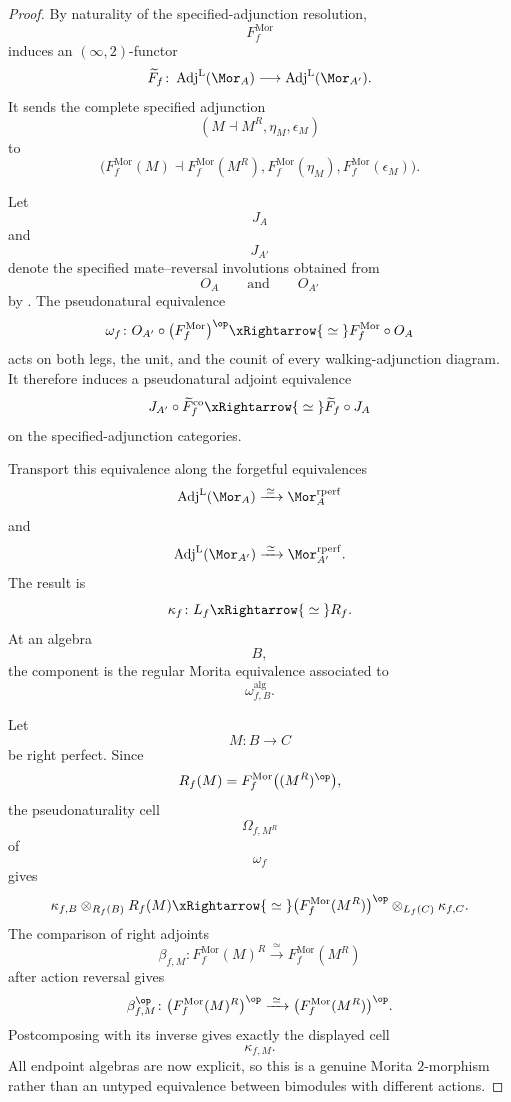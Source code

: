 \begin{proof}
By naturality of the specified-adjunction resolution,
\[
    F_f^{\mathrm{Mor}}
\]
induces an $(\infty,2)$-functor
\[
    \widetilde F_f
    \colon
    \operatorname{Adj}^{\mathrm L}(\Mor_A)
    \longrightarrow
    \operatorname{Adj}^{\mathrm L}(\Mor_{A'}).
\]
It sends the complete specified adjunction
\[
    (M\dashv M^R,\eta_M,\epsilon_M)
\]
to
\[
    \bigl(
        F_f^{\mathrm{Mor}}(M)
        \dashv
        F_f^{\mathrm{Mor}}(M^R),
        F_f^{\mathrm{Mor}}(\eta_M),
        F_f^{\mathrm{Mor}}(\epsilon_M)
    \bigr).
\]

Let
\[
    J_A
\]
and
\[
    J_{A'}
\]
denote the specified mate--reversal involutions obtained from
\[
    O_A
    \qquad\text{and}\qquad
    O_{A'}
\]
by
.
The pseudonatural equivalence
\[
    \omega_f
    \colon
    O_{A'}
    \circ
    \bigl(F_f^{\mathrm{Mor}}\bigr)^{\op}
    \xRightarrow{\;\simeq\;}
    F_f^{\mathrm{Mor}}
    \circ
    O_A
\]
acts on both legs, the unit, and the counit of every walking-adjunction
diagram. It therefore induces a pseudonatural adjoint equivalence
\[
    J_{A'}
    \circ
    \widetilde F_f^{\mathrm{co}}
    \xRightarrow{\;\simeq\;}
    \widetilde F_f
    \circ
    J_A
\]
on the specified-adjunction categories.

Transport this equivalence along the forgetful equivalences
\[
    \operatorname{Adj}^{\mathrm L}(\Mor_A)
    \xrightarrow{\;\simeq\;}
    \Mor_A^{\mathrm{rperf}}
\]
and
\[
    \operatorname{Adj}^{\mathrm L}(\Mor_{A'})
    \xrightarrow{\;\simeq\;}
    \Mor_{A'}^{\mathrm{rperf}}.
\]
The result is
\[
    \kappa_f
    \colon
    L_f
    \xRightarrow{\;\simeq\;}
    R_f.
\]
At an algebra
\[
    B,
\]
the component is the regular Morita equivalence associated to
\[
    \omega_{f,B}^{\mathrm{alg}}.
\]

Let
\[
    M
    \colon
    B
    \longrightarrow
    C
\]
be right perfect. Since
\[
    R_f(M)
    =
    F_f^{\mathrm{Mor}}
    \bigl(
        (M^R)^{\op}
    \bigr),
\]
the pseudonaturality cell
\[
    \Omega_{f,M^R}
\]
of
\[
    \omega_f
\]
gives
\[
\begin{aligned}
    \kappa_{f,B}
    \otimes_{R_f(B)}
    R_f(M)
    \xRightarrow{\;\simeq\;}
    \bigl(
        F_f^{\mathrm{Mor}}(M^R)
    \bigr)^{\op}
    \otimes_{L_f(C)}
    \kappa_{f,C}.
\end{aligned}
\]
The comparison of right adjoints
\[
    \beta_{f,M}
    \colon
    F_f^{\mathrm{Mor}}(M)^R
    \xrightarrow{\;\simeq\;}
    F_f^{\mathrm{Mor}}(M^R)
\]
after action reversal gives
\[
    \beta_{f,M}^{\op}
    \colon
    \bigl(
        F_f^{\mathrm{Mor}}(M)^R
    \bigr)^{\op}
    \xrightarrow{\;\simeq\;}
    \bigl(
        F_f^{\mathrm{Mor}}(M^R)
    \bigr)^{\op}.
\]
Postcomposing with its inverse gives exactly the displayed cell
\[
    \kappa_{f,M}.
\]
All endpoint algebras are now explicit, so this is a genuine Morita
$2$-morphism rather than an untyped equivalence between bimodules with
different actions.


\end{proof}
